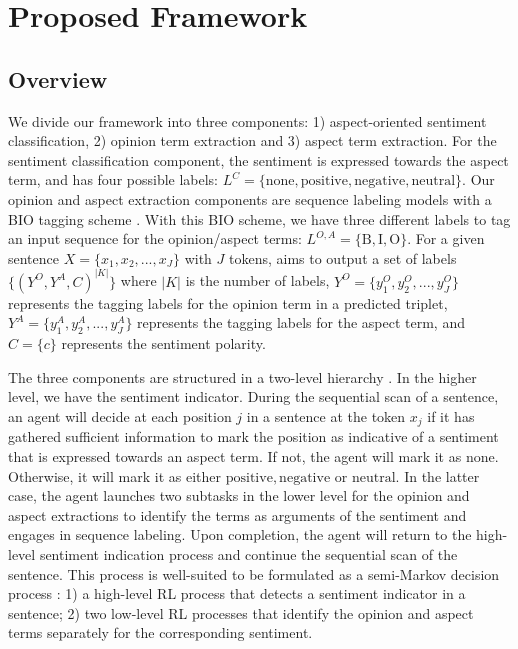 \documentclass[sigconf]{acmart}
\begin{document}
\section{Proposed Framework}
\subsection{Overview}

We divide our framework \textbf{\mymodel{}} into three components: 1) aspect-oriented sentiment classification, 2) opinion term extraction and 3) aspect term extraction. For the sentiment classification component, the sentiment is expressed towards the aspect term, and has four possible labels: $L^{C}=\{\mathrm{none, positive, negative, neutral}\}$. Our opinion and aspect extraction components are sequence labeling models with a BIO tagging scheme \cite{ramshaw1999text}. With this BIO scheme, we have three different labels to tag an input sequence for the opinion/aspect terms: $L^{O,A} = \{\mathrm{B,I,O}\}$. For a given sentence $X=\{x_1, x_2,..., x_J\}$ with $J$ tokens, \mymodel{} aims to output a set of labels $\{(Y^{O},Y^{A},C)^{|K|}\}$ where $|K|$ is the number of labels, $Y^{O}=\{y_1^O, y_2^O,..., y_J^O\}$ represents the tagging labels for the opinion term in a predicted triplet, $Y^{A}=\{y_1^A, y_2^A,..., y_J^A\}$ represents the tagging labels for the aspect term, and $C=\{c\}$ represents the sentiment polarity.

The three components are structured in a two-level hierarchy \citep{takanobu2019hierarchical}. In the higher level, we have the sentiment indicator. During the sequential scan of a sentence, an agent will decide at each position $j$ in a sentence at the token $x_j$ if it has gathered sufficient information to mark the position as indicative of a sentiment that is expressed towards an aspect term. If not, the agent will mark it as $\mathrm{none}$. Otherwise, it will mark it as either $\mathrm{positive, negative}$ or $\mathrm{neutral}$. In the latter case, the agent launches two subtasks in the lower level for the opinion and aspect extractions to identify the terms as arguments of the sentiment and engages in sequence labeling. Upon completion, the agent will return to the high-level sentiment indication process and continue the sequential scan of the sentence. This process is well-suited to be formulated as a semi-Markov decision process \citep{sutton1999between}: 1) a high-level RL process that detects a sentiment indicator in a sentence; 2) two low-level RL processes that identify the opinion and aspect terms separately for the corresponding sentiment.
\end{document}
